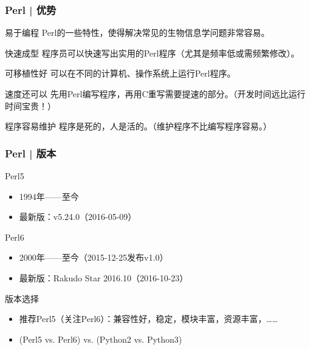 \begin{frame}
  \frametitle{Perl | 优势}
  \begin{block}{易于编程}
    Perl的一些特性，使得解决常见的生物信息学问题非常容易。
  \end{block}
  \pause
  \begin{block}{快速成型}
    程序员可以快速写出实用的Perl程序（尤其是频率低或需频繁修改）。
  \end{block}
  \pause
  \begin{block}{可移植性好}
    可以在不同的计算机、操作系统上运行Perl程序。
  \end{block}
  \pause
  \begin{block}{速度还可以}
    先用Perl编写程序，再用C重写需要提速的部分。（开发时间远比运行时间宝贵！）
  \end{block}
  \pause
  \begin{block}{程序容易维护}
    程序是死的，人是活的。（维护程序不比编写程序容易。）
  \end{block}
\end{frame}

\begin{frame}
  \frametitle{Perl | 版本}
  \begin{block}{Perl5}
    \begin{itemize}
      \item 1994年——至今
      \item 最新版：v5.24.0（2016-05-09）
    \end{itemize}
  \end{block}
  \pause
  \begin{block}{Perl6}
    \begin{itemize}
      \item 2000年——至今（2015-12-25发布v1.0）
      \item 最新版：Rakudo Star 2016.10（2016-10-23）
    \end{itemize}
  \end{block}
  \pause
  \begin{block}{版本选择}
    \begin{itemize}
      \item 推荐Perl5（关注Perl6）：兼容性好，稳定，模块丰富，资源丰富，……
      \item (Perl5 vs. Perl6) vs. (Python2 vs. Python3)
    \end{itemize}
  \end{block}
\end{frame}

